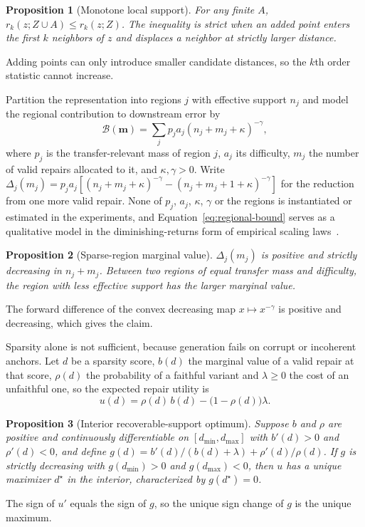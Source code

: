 \documentclass{article}
\newtheorem{proposition}{Proposition}
\begin{document}
\begin{proposition}[Monotone local support]
\label{prop:local-support}
For any finite $A$, $r_k(z;Z\cup A)\leq r_k(z;Z)$. The inequality is strict when an added point enters the first $k$ neighbors of $z$ and displaces a neighbor at strictly larger distance.
\end{proposition}
Adding points can only introduce smaller candidate distances, so the $k$th order statistic cannot increase.

Partition the representation into regions $j$ with effective support $n_j$ and model the regional contribution to downstream error by
\begin{equation}
\mathcal B(\mathbf m)=\sum_j p_j a_j(n_j+m_j+\kappa)^{-\gamma},
\label{eq:regional-bound}
\end{equation}
where $p_j$ is the transfer-relevant mass of region $j$, $a_j$ its difficulty, $m_j$ the number of valid repairs allocated to it, and $\kappa,\gamma>0$. Write $\Delta_j(m_j)=p_ja_j[(n_j+m_j+\kappa)^{-\gamma}-(n_j+m_j+1+\kappa)^{-\gamma}]$ for the reduction from one more valid repair. None of $p_j$, $a_j$, $\kappa$, $\gamma$ or the regions is instantiated or estimated in the experiments, and Equation~\ref{eq:regional-bound} serves as a qualitative model in the diminishing-returns form of empirical scaling laws~\citep{sorscher2022beyond}.

\begin{proposition}[Sparse-region marginal value]
\label{prop:sparse-value}
$\Delta_j(m_j)$ is positive and strictly decreasing in $n_j+m_j$. Between two regions of equal transfer mass and difficulty, the region with less effective support has the larger marginal value.
\end{proposition}
The forward difference of the convex decreasing map $x\mapsto x^{-\gamma}$ is positive and decreasing, which gives the claim.

Sparsity alone is not sufficient, because generation fails on corrupt or incoherent anchors. Let $d$ be a sparsity score, $b(d)$ the marginal value of a valid repair at that score, $\rho(d)$ the probability of a faithful variant and $\lambda\geq0$ the cost of an unfaithful one, so the expected repair utility is
\begin{equation}
u(d)=\rho(d)\,b(d)-\bigl(1-\rho(d)\bigr)\lambda.
\label{eq:repair-utility}
\end{equation}

\begin{proposition}[Interior recoverable-support optimum]
\label{prop:interior}
Suppose $b$ and $\rho$ are positive and continuously differentiable on $[d_{\min},d_{\max}]$ with $b'(d)>0$ and $\rho'(d)<0$, and define $g(d)=b'(d)/(b(d)+\lambda)+\rho'(d)/\rho(d)$. If $g$ is strictly decreasing with $g(d_{\min})>0$ and $g(d_{\max})<0$, then $u$ has a unique maximizer $d^\star$ in the interior, characterized by $g(d^\star)=0$.
\end{proposition}
The sign of $u'$ equals the sign of $g$, so the unique sign change of $g$ is the unique maximum.
\end{document}
